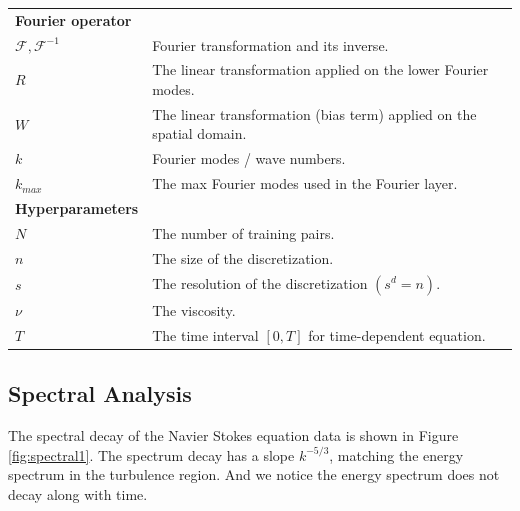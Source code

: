 \documentclass{article} %
\newcommand{\cG}{\mathcal{F}}
\begin{document}
\begin{table}[h]
\begin{center}
\begin{tabular}{|l|l|}
{\bf Fourier operator} &\\
$\cG, \cG^{-1}$ & Fourier transformation and its inverse.\\
$R$ & The linear transformation applied on the lower Fourier modes.\\
$W$ & The linear transformation (bias term) applied on the spatial domain. \\
$k$ & Fourier modes / wave numbers.\\
$k_{max}$ & The max Fourier modes used in the Fourier layer.\\
\hline 
{\bf Hyperparameters} &\\
$N$  & The number of training pairs. \\
$n$  & The size of the discretization. \\
$s$  & The resolution of the discretization $(s^d = n)$. \\
$\nu$ & The viscosity. \\
$T$ & The time interval $[0,T]$ for time-dependent equation. \\
\hline
\end{tabular}
\end{center}
\end{table}

\subsection{Spectral Analysis}
\label{app:sepctral}
The spectral decay of the Navier Stokes equation data is shown in Figure \ref{fig:spectral1}. The spectrum decay has a slope $k^{-5/3}$, matching the energy spectrum in the turbulence region. And we notice the energy spectrum does not decay along with time.
\end{document}
